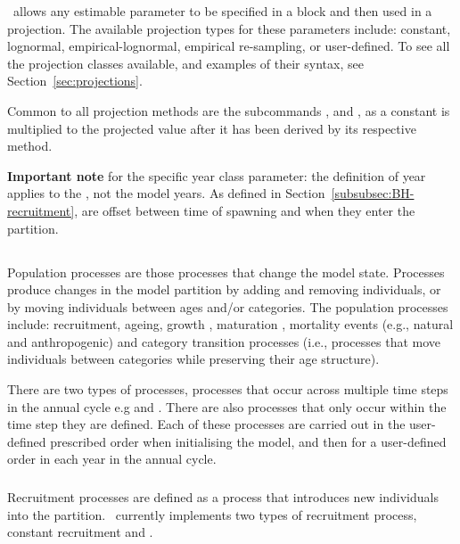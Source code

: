 \CNAME\ allows any estimable parameter to be specified in a  block and then used in a projection. The available projection types for these parameters include: constant, lognormal, empirical-lognormal, empirical re-sampling, or user-defined. To see all the projection classes available, and examples of their syntax, see Section~\ref{sec:projections}.

Common to all projection methods are the subcommands ,  and , as a constant is multiplied to the projected value after it has been derived by its respective method.

\textbf{Important note} for the specific year class parameter: the definition of year applies to the , not the model years. As defined in Section~\ref{subsubsec:BH-recruitment},  are offset between time of spawning and when they enter the partition. 

\subsection{}
Population processes are those processes that change the model state. Processes produce changes in the model partition by adding and removing individuals, or by moving individuals between ages and/or categories. The population processes include: recruitment, ageing,  growth , maturation , mortality events (e.g., natural and anthropogenic) and category transition processes (i.e., processes that move individuals between categories while preserving their age structure). 

There are two types of processes, processes that occur across multiple time steps in the annual cycle e.g  and . There are also processes that only occur within the time step they are defined. Each of these processes are carried out in the user-defined prescribed order when initialising the model, and then for a user-defined order in each year in the annual cycle. 

\subsubsection{}

Recruitment processes are defined as a process that introduces new individuals into the partition. \CNAME\ currently implements two types of recruitment process, constant recruitment and   \citep{1203}.

